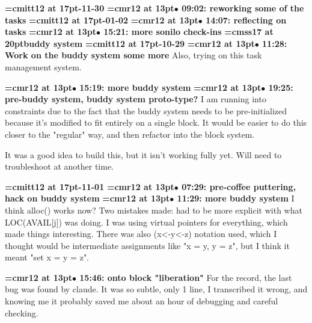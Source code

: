 {\medskip\noindent\bf\font\titlefont=cmitt12 at 17pt-11-30}\medskip
{\smallskip\noindent\bf\font\titlefont=cmr12 at 13pt\titlefont $\bullet$ 09:02: reworking some of the tasks}\smallskip
{\medskip\noindent\bf\font\titlefont=cmitt12 at 17pt-01-02}\medskip
{\smallskip\noindent\bf\font\titlefont=cmr12 at 13pt\titlefont $\bullet$ 14:07: reflecting on tasks}\smallskip
{\smallskip\noindent\bf\font\titlefont=cmr12 at 13pt\titlefont $\bullet$ 15:21: more sonilo check-ins}\smallskip
{}
{\medskip\noindent\bf\font\titlefont=cmss17 at 20pt\titlefont buddy system}\medskip
{\medskip\noindent\bf\font\titlefont=cmitt12 at 17pt-10-29}\medskip
{\smallskip\noindent\bf\font\titlefont=cmr12 at 13pt\titlefont $\bullet$ 11:28: Work on the buddy system some more}\smallskip
Also, trying on this task management system.
\par

{\smallskip\noindent\bf\font\titlefont=cmr12 at 13pt\titlefont $\bullet$ 15:19: more buddy system}\smallskip
{\smallskip\noindent\bf\font\titlefont=cmr12 at 13pt\titlefont $\bullet$ 19:25: pre-buddy system, buddy system proto-type?}\smallskip
I am running into constraints due to the fact that the buddy system needs to be pre-initialized because it's modified to fit entirely on a single block. It would be easier to do this closer to the "regular" way, and then refactor into the block system.
\par

It was a good idea to build this, but it isn't working fully yet. Will need to troubleshoot at another time.
\par

{\medskip\noindent\bf\font\titlefont=cmitt12 at 17pt-11-01}\medskip
{\smallskip\noindent\bf\font\titlefont=cmr12 at 13pt\titlefont $\bullet$ 07:29: pre-coffee puttering, hack on buddy system}\smallskip
{\smallskip\noindent\bf\font\titlefont=cmr12 at 13pt\titlefont $\bullet$ 11:29: more buddy system}\smallskip
I think alloc() works now? Two mistakes made: had to be more explicit with what LOC(AVAIL[j]) was doing. I was using virtual pointers for everything, which made things interesting. There was also (x<-y<-z) notation used, which I thought would be intermediate assignments like "x = y, y = z", but I think it meant "set x = y = z".
\par

{\smallskip\noindent\bf\font\titlefont=cmr12 at 13pt\titlefont $\bullet$ 15:46: onto block "liberation"}\smallskip
For the record, the last bug was found by claude. It was so subtle, only 1 line, I transcribed it wrong, and knowing me it probably saved me about an hour of debugging and careful checking.
\par


